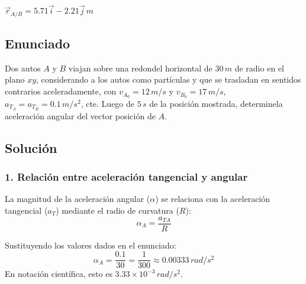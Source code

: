 \documentclass[12pt, a4paper]{article}
\begin{document}
\begin{tcolorbox}[colback=green!5!white, colframe=green!50!black, title=Respuesta Final]
\centering \Large $\vec{r}_{A/B} = 5.71\vec{i} - 2.21\vec{j} \, \si{m}$
\end{tcolorbox}

\newpage

\subsection*{Enunciado}
Dos autos $A$ y $B$ viajan sobre una redondel horizontal de $30 \, \si{m}$ de radio en el plano $xy$, considerando a los autos como partículas y que se trasladan en sentidos contrarios aceleradamente, con $v_{A_0} = 12 \, \si{m/s}$ y $v_{B_0} = 17 \, \si{m/s}$, $a_{T_A} = a_{T_B} = 0.1 \, \si{m/s^2}$, cte. Luego de $5 \, \si{s}$ de la posición mostrada, determinela aceleración angular del vector posición de $A$.

\begin{center}
\end{center}

\subsection*{Solución}

\subsubsection*{1. Relación entre aceleración tangencial y angular}
La magnitud de la aceleración angular ($\alpha$) se relaciona con la aceleración tangencial ($a_T$) mediante el radio de curvatura ($R$):
$$ \alpha_A = \frac{a_{TA}}{R} $$

Sustituyendo los valores dados en el enunciado:
$$ \alpha_A = \frac{0.1}{30} = \frac{1}{300} \approx 0.00333 \, \si{rad/s^2} $$
En notación científica, esto es $3.33 \times 10^{-3} \, \si{rad/s^2}$.
\end{document}
